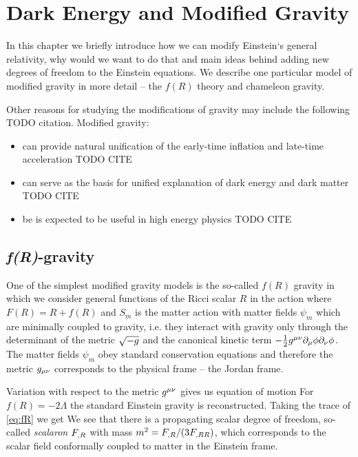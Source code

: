 \chapter{Dark Energy and Modified Gravity}
In this chapter we briefly introduce how we can modify Einstein`s general relativity, why would we want to do that and main ideas behind adding new degrees of freedom to the Einstein equations. We describe one particular model of modified gravity in more detail -- the $f(R)$ theory and chameleon gravity.

Other reasons for studying the modifications of gravity may include the following TODO citation. Modified gravity:
\begin{itemize}
	\item can provide natural unification of the early-time inflation and late-time acceleration TODO CITE
	\item can serve as the basis for unified explanation of dark energy and dark matter TODO CITE
	\item be is expected to be useful in high energy physics TODO CITE
\end{itemize}



\section{\textit{f(R)}-gravity}
One of the simplest modified gravity models is the so-called $f(R)$ gravity in which we consider general functions of the Ricci scalar $R$ in the action
where $F(R)=R+f(R)$ and $S_m$ is the matter action with matter fields $\psi_m$ which are minimally coupled to gravity, i.e. they interact with gravity only through the determinant of the metric $\sqrt{-g}$ and the canonical kinetic term $-\frac12g^{\mu\nu}\partial_\mu\phi\partial_\nu\phi$. The matter fields $\psi_m$ obey standard conservation equations and therefore the metric $g_{\mu\nu}$ corresponds to the physical frame -- the Jordan frame.

Variation with respect to the metric $g^{\mu\nu}$ gives us equation of motion
For $f(R)=-2\Lambda$ the standard Einstein gravity is reconstructed. Taking the trace of \eqref{eq:fR} we get
We see that there is a propagating scalar degree of freedom, so-called \textit{scalaron} $F_{,R}$ with mass $m^2=F_{,R}/(3F_{,RR})$, which corresponds to the scalar field conformally coupled to matter in the Einstein frame.

